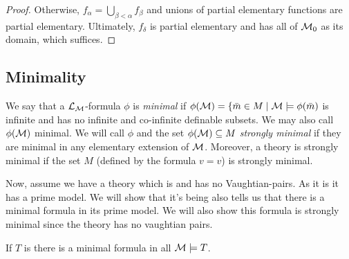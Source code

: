 \begin{proof}
Otherwise, \(f_\alpha = \bigcup_{\beta < \alpha}f_\beta\) and unions of partial elementary functions are partial elementary. 
Ultimately, \(f_\delta\) is partial elementary and has all of \(\mathcal{M}_0\) as its domain, which suffices. 


\end{proof}

\subsection{Minimality}

\begin{definition}\label{definition_minimality}
We say that a \(\mathcal{L}_{\mathcal{M}}\)-formula \(\phi\) is \textit{minimal} if \(\phi(\mathcal{M}) = \{\bar{m} \in M \mid \mathcal{M} \models \phi(\bar{m})\) is infinite and has no infinite and co-infinite definable subsets. 
We may also call \(\phi(\mathcal{M})\) minimal. 
We will call \(\phi\) and the set \(\phi(\mathcal{M}) \subseteq M\) 
\textit{strongly minimal} if they are minimal in any elementary extension of \(\mathcal{M}\).
Moreover, a theory is strongly minimal if the set \(M\) (defined by the formula \(v = v\)) is strongly minimal. 
\end{definition}

Now, assume we have a theory which is \omst and has no Vaughtian-pairs. 
As it is \omst it has a prime model.
We will show that it's being \omst also tells us that there is a minimal formula in its prime model.
We will also show this formula is strongly minimal since the theory has no vaughtian pairs. 

\begin{lemma}\label{lemma_minimal_omst}
If \(T\) is \omst there is a minimal formula in all \(\mathcal{M} \models T\).
\end{lemma}

